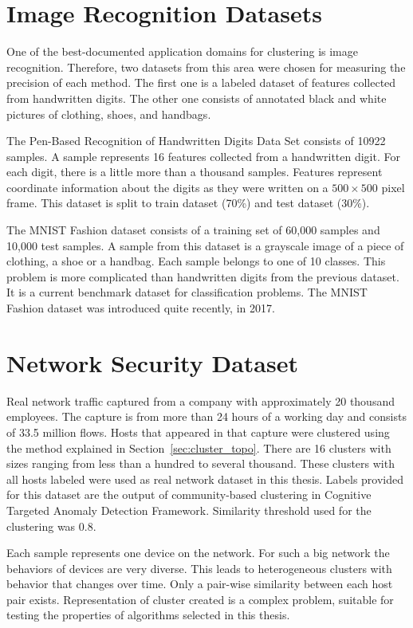 \documentclass[thesis=B,english]{FITthesis}[2012/10/20]
\begin{document}
\section{Image Recognition Datasets}
One of the best-documented application domains for clustering is image recognition.
Therefore, two datasets from this area were chosen for measuring the precision of each method.
The first one is a labeled dataset of features collected from handwritten digits.
The other one consists of annotated black and white pictures of clothing, shoes, and handbags.

The Pen-Based Recognition of Handwritten Digits Data Set \cite{dua1998pendigit} consists of 10922 samples.
A sample represents 16 features collected from a handwritten digit.
For each digit, there is a little more than a thousand samples.
Features represent coordinate information about the digits as they were written on a $500\times500$ pixel frame.
This dataset is split to train dataset (70\%) and test dataset (30\%).

The MNIST Fashion dataset \cite{xiao2017fashion} consists of a training set of 60,000 samples and 10,000 test samples.
A sample from this dataset is a grayscale image of a piece of clothing, a shoe or a handbag.
Each sample belongs to one of 10 classes.
This problem is more complicated than handwritten digits from the previous dataset.
It is a current benchmark dataset for classification problems.
The MNIST Fashion dataset was introduced quite recently, in 2017.

\section{Network Security Dataset}\label{sec:real-data}
Real network traffic captured from a company with approximately 20 thousand employees.
The capture is from more than 24 hours of a working day and consists of 33.5  million flows.
Hosts that appeared in that capture were clustered using the method explained in Section~\ref{sec:cluster_topo}.
There are 16 clusters with sizes ranging from less than a hundred to several thousand.
These clusters with all hosts labeled were used as real network dataset in this thesis.
Labels provided for this dataset are the output of community-based clustering in Cognitive Targeted Anomaly Detection Framework.
Similarity threshold used for the clustering was 0.8.

Each sample represents one device on the network.
For such a big network the behaviors of devices are very diverse.
This leads to heterogeneous clusters with behavior that changes over time.
Only a pair-wise similarity between each host pair exists.
Representation of cluster created is a complex problem, suitable for testing the properties of algorithms selected in this thesis.
\end{document}
